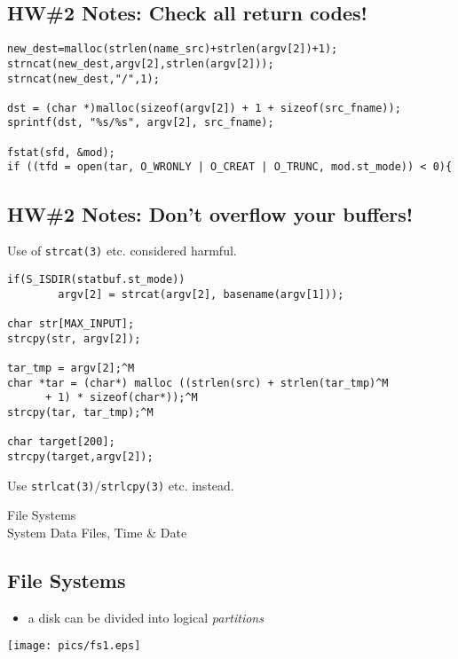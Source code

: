 \documentclass[xga]{xdvislides}
\begin{document}
\subsection{HW\#2 Notes: Check all return codes!}
\begin{verbatim}
new_dest=malloc(strlen(name_src)+strlen(argv[2])+1);
strncat(new_dest,argv[2],strlen(argv[2]));
strncat(new_dest,"/",1);

dst = (char *)malloc(sizeof(argv[2]) + 1 + sizeof(src_fname));
sprintf(dst, "%s/%s", argv[2], src_fname);

fstat(sfd, &mod);
if ((tfd = open(tar, O_WRONLY | O_CREAT | O_TRUNC, mod.st_mode)) < 0){
\end{verbatim}
\Normalsize

\subsection{HW\#2 Notes: Don't overflow your buffers!}
Use of \verb+strcat(3)+ etc. considered harmful.
\vspace*{\fill}
\begin{verbatim}
if(S_ISDIR(statbuf.st_mode))
        argv[2] = strcat(argv[2], basename(argv[1]));

char str[MAX_INPUT];
strcpy(str, argv[2]);

tar_tmp = argv[2];^M
char *tar = (char*) malloc ((strlen(src) + strlen(tar_tmp)^M
      + 1) * sizeof(char*));^M
strcpy(tar, tar_tmp);^M

char target[200];
strcpy(target,argv[2]);
\end{verbatim}

Use \verb+strlcat(3)+/\verb+strlcpy(3)+ etc. instead.
\vspace*{\fill}

\pagebreak

\vspace*{\fill}
\begin{center}
  \Hugesize
	File Systems
	\hspace*{5mm}\blueline\\ [1em]
	System Data Files, Time \& Date
  \Normalsize
\end{center}
\vspace*{\fill}



\subsection{File Systems}
\begin{itemize}
	\item a disk can be divided into logical {\em partitions}
\end{itemize}
\texttt{[image: pics/fs1.eps]}
\end{document}
